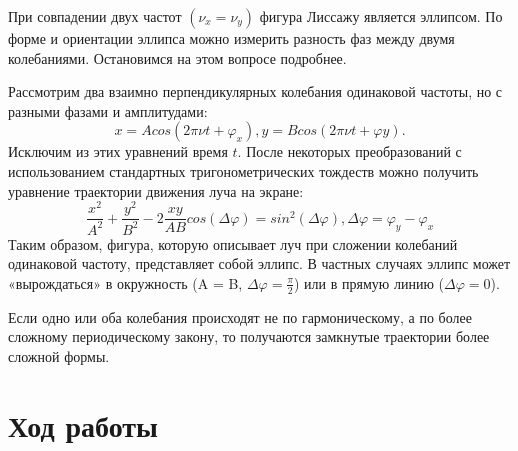 \documentclass[a4paper]{article}
\begin{document}
При совпадении двух частот $(\nu_{x} = \nu_{y})$ фигура Лиссажу является эллипсом. По форме и ориентации эллипса можно измерить разность фаз между двумя колебаниями. Остановимся на этом вопросе подробнее. 

Рассмотрим два взаимно перпендикулярных колебания одинаковой частоты, но с разными фазами и амплитудами:
\[x = Acos(2\pi\nu t + \varphi_{x}), y = Bcos(2\pi\nu t + \varphi{y}).\]
Исключим из этих уравнений время $t$. После некоторых преобразований с использованием стандартных тригонометрических тождеств можно получить уравнение траектории движения луча на экране:
\[\frac{x^2}{A^2} + \frac{y^2}{B^2} - 2\frac{xy}{AB}cos(\Delta\varphi) = sin^2(\Delta\varphi),\Delta\varphi = \varphi_{y} - \varphi_{x}\]
Таким образом, фигура, которую описывает луч при сложении колебаний одинаковой частоту, представляет собой эллипс. В частных случаях эллипс может «вырождаться» в окружность (A = B, $\Delta\varphi = \frac{\pi}{2}$) или в прямую линию ($\Delta\varphi = 0$).

Если одно или оба колебания происходят не по гармоническому, а по более сложному периодическому закону, то получаются замкнутые траектории более сложной формы.

\section{Ход работы}
\end{document}
